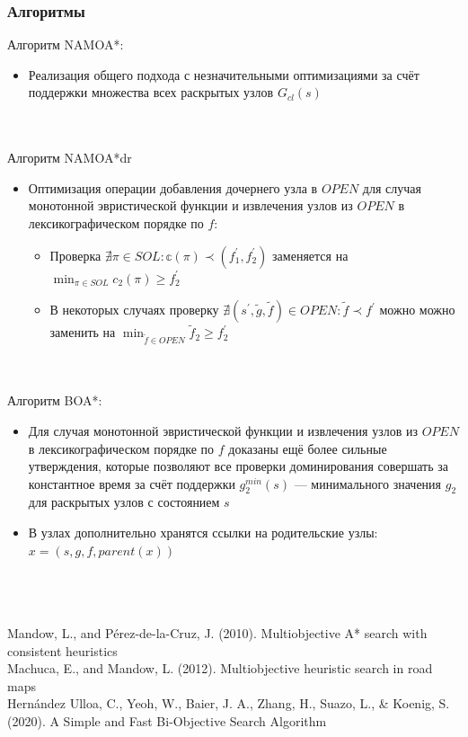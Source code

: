 \documentclass[aspectratio=169,8pt]{beamer}
\begin{document}
\begin{frame}
\frametitle{Алгоритмы}
Алгоритм NAMOA*:
\begin{itemize}
\item Реализация общего подхода с незначительными оптимизациями за счёт поддержки множества всех раскрытых узлов $G_{cl}(s)$
\end{itemize}
\ \\ \ \\
Алгоритм NAMOA*dr
\begin{itemize}
\item Оптимизация операции добавления дочернего узла в $OPEN$ для случая монотонной эвристической функции и извлечения узлов из $OPEN$ в лексикографическом порядке по $f$:
\begin{itemize}
\item Проверка $\nexists \pi \in SOL: \mathbb{c}(\pi) \prec (f_1 ^ {'}, f_2 ^ {'})$ заменяется на $\min_{\pi \in SOL} {c_2(\pi)} \geq f_2 ^ {'}$
\item В некоторых случаях проверку $\nexists (s ^ {'}, \tilde{g}, \tilde{f}) \in OPEN: \tilde{f} \prec f ^ {'}$ можно можно заменить на $\min_{\tilde{f} \in OPEN} {\tilde{f}_2} \geq f_2 ^ {'}$
\end{itemize} 
\end{itemize}
\ \\ \ \\
Алгоритм BOA*:
\begin{itemize}
\item Для случая монотонной эвристической функции и извлечения узлов из $OPEN$ в лексикографическом порядке по $f$ доказаны ещё более сильные утверждения, которые позволяют все проверки доминирования совершать за константное время за счёт поддержки $g_2 ^ {min} (s)$ --- минимального значения $g_2$ для раскрытых узлов с состоянием $s$
\item В узлах дополнительно хранятся ссылки на родительские узлы: $x = (s, g, f, parent(x))$
\end{itemize}
\ \\ \ \\ \ \\
\footnotesize{Mandow, L., and Pérez-de-la-Cruz, J. (2010). Multiobjective A* search with consistent heuristics}\\
\footnotesize{Machuca, E., and Mandow, L. (2012). Multiobjective heuristic search in road maps}\\
\footnotesize{Hernández Ulloa, C., Yeoh, W., Baier, J. A., Zhang, H., Suazo, L., \& Koenig, S. (2020). A Simple and Fast Bi-Objective Search Algorithm}

\end{frame}
\end{document}
